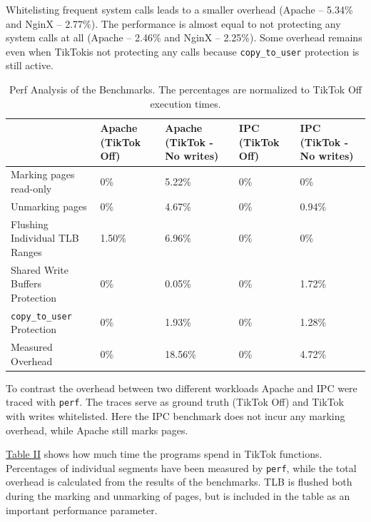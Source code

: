 \documentclass[conference]{IEEEtran}
\newcommand{\sysname}{TikTok}
\begin{document}
Whitelisting frequent system calls leads to a smaller overhead (Apache -- 5.34\% and
NginX -- 2.77\%). The performance is almost equal to not protecting any
system calls at all (Apache -- 2.46\% and NginX -- 2.25\%). Some overhead
remains even when \sysname is not protecting any calls because
\texttt{copy\_to\_user} protection is still active.

\begin{table}[]
  \label{perftable}
  \centering
  \begin{tabular}{|l|l|l|l|l|}
  \hline
                                     & Apache (\sysname{} Off) & Apache (\sysname{} - No writes) & IPC (\sysname{} Off) & IPC (\sysname{} - No writes)\\ \hline
  Marking pages read-only            & 0\%    & 5.22\%          & 0\% & 0\%         \\ \hline
  Unmarking pages                    & 0\%    & 4.67\%          & 0\% & 0.94\%      \\ \hline
  Flushing Individual TLB Ranges     & 1.50\% & 6.96\%          & 0\% & 0\%         \\ \hline
  Shared Write Buffers Protection    & 0\%    & 0.05\%          & 0\% & 1.72\%      \\ \hline
  \texttt{copy\_to\_user} Protection & 0\%    & 1.93\%          & 0\% & 1.28\%      \\ \hline
  Measured Overhead                  & 0\%    & 18.56\%         & 0\% & 4.72\%      \\ \hline
  \end{tabular}
  \caption{Perf Analysis of the Benchmarks. The percentages are normalized to \sysname{} Off execution times.}
\end{table}

To contrast the overhead between two different workloads Apache and IPC were
traced with \texttt{perf}. The traces serve as ground truth
(\sysname{} Off) and \sysname{} with writes whitelisted. Here the IPC benchmark
does not incur any marking overhead, while Apache still marks pages.

\hyperref[perftable]{Table II} shows how much time the programs spend in
\sysname{} functions. Percentages of individual segments have been measured by
\texttt{perf}, while the total overhead is calculated from the results of the
benchmarks. TLB is flushed both during the marking and unmarking of
pages, but is included in the table as an important performance parameter.
\end{document}
